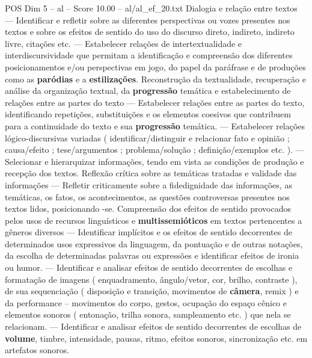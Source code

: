\begin{textsample}{POS Dim 5 – al – Score 10.00 – al/al\_ef\_20.txt}
Dialogia e relação entre textos — Identificar e refletir sobre as diferentes perspectivas ou vozes presentes nos textos e sobre os efeitos de sentido do uso do discurso direto, indireto, indireto livre, citações etc. — Estabelecer relações de intertextualidade e interdiscursividade que permitam a identificação e compreensão dos diferentes posicionamentos e/ou perspectivas em jogo, do papel da paráfrase e de produções como as \textbf{paródias} e a \textbf{estilizações}.
Reconstrução da textualidade, recuperação e análise da organização textual, da \textbf{progressão} temática e estabelecimento de relações entre as partes do texto — Estabelecer relações entre as partes do texto, identificando repetições, substituições e os elementos coesivos que contribuem para a continuidade do texto e sua \textbf{progressão} temática. — Estabelecer relações lógico-discursivas variadas ( identificar/distinguir e relacionar fato e opinião ; causa/efeito ; tese/argumentos ; problema/solução ; definição/exemplos etc. ). — Selecionar e hierarquizar informações, tendo em vista as condições de produção e recepção dos textos.
Reflexão crítica sobre as temáticas tratadas e validade das informações — Refletir criticamente sobre a fidedignidade das informações, as temáticas, os fatos, os acontecimentos, as questões controversas presentes nos textos lidos, posicionando -se.
Compreensão dos efeitos de sentido provocados pelos usos de recursos linguísticos e \textbf{multissemióticos} em textos pertencentes a gêneros diversos — Identificar implícitos e os efeitos de sentido decorrentes de determinados usos expressivos da linguagem, da pontuação e de outras notações, da escolha de determinadas palavras ou expressões e identificar efeitos de ironia ou humor. — Identificar e analisar efeitos de sentido decorrentes de escolhas e formatação de imagens ( enquadramento, ângulo/vetor, cor, brilho, contraste ), de sua sequenciação ( disposição e transição, movimentos de \textbf{câmera}, remix ) e da performance – movimentos do corpo, gestos, ocupação do espaço cênico e elementos sonoros ( entonação, trilha sonora, sampleamento etc. ) que nela se relacionam. — Identificar e analisar efeitos de sentido decorrentes de escolhas de \textbf{volume}, timbre, intensidade, pausas, ritmo, efeitos sonoros, sincronização etc. em artefatos sonoros.

\end{textsample}
